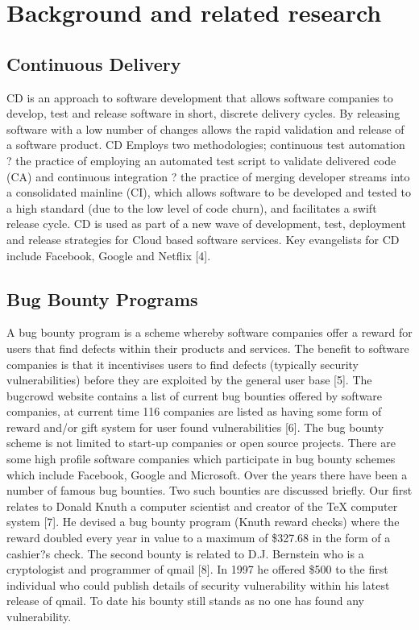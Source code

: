 \documentclass[conference]{IEEEtran}
\begin{document}

\section{Background and related research}

\subsection{Continuous Delivery}
CD is an approach to software development that allows software companies to develop, test and release software in short, discrete delivery cycles. By releasing software with a low number of changes allows the rapid validation and release of a software product. CD Employs two methodologies; continuous test automation ? the practice of employing an automated test script to validate delivered code (CA) and continuous integration ? the practice of merging developer streams into a consolidated mainline (CI), which allows software to be developed and tested to a high standard (due to the low level of code churn), and facilitates a swift release cycle. CD is used as part of a new wave of development, test, deployment and release strategies for Cloud based software services. Key evangelists for CD include Facebook, Google and Netflix [4]. 

\subsection{Bug Bounty Programs}
A bug bounty program is a scheme whereby software companies offer a reward for users that find defects within their products and services. The benefit to software companies is that it incentivises users to find defects (typically security vulnerabilities) before they are exploited by the general user base [5]. The bugcrowd website contains a list of current bug bounties offered by software companies, at current time 116 companies are listed as having some form of reward and/or gift system for user found vulnerabilities [6]. The bug bounty scheme is not limited to start-up companies or open source projects.  There are some high profile software companies which participate in bug bounty schemes which include Facebook, Google and Microsoft. 
Over the years there have been a number of famous bug bounties. Two such bounties are discussed briefly. Our first relates to Donald Knuth a computer scientist and creator of the TeX computer system [7]. He devised a bug bounty program (Knuth reward checks) where the reward doubled every year in value to a maximum of  \$327.68 in the form of a cashier?s check. The second bounty is related to D.J. Bernstein who is a cryptologist and programmer of qmail [8]. In 1997 he offered \$500 to the first individual who could publish details of security vulnerability within his latest release of qmail. To date his bounty still stands as no one has found any vulnerability. 
\end{document}
